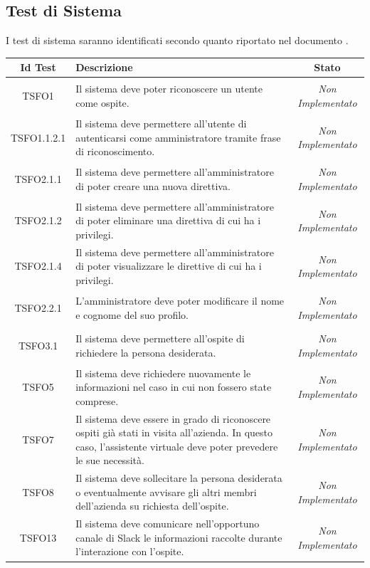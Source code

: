 \subsection{Test di Sistema}
I test di sistema saranno identificati secondo quanto riportato nel documento \NPdoc{}.
\normalsize
\begin{longtable}{|c|>{}m{8cm}|c|}
\hline
\textbf{Id Test} & \textbf{Descrizione} & \textbf{Stato}\\
\hline
\endhead
\hypertarget{TSFO1}{TSFO1} & Il sistema deve poter riconoscere un utente come ospite. & \textit{Non Implementato}\\ \hline
\hypertarget{TSFO1.1.2.1}{TSFO1.1.2.1} & Il sistema deve permettere all'utente di autenticarsi come amministratore tramite frase di riconoscimento. & \textit{Non Implementato}\\ \hline
\hypertarget{TSFO2.1.1}{TSFO2.1.1} & Il sistema deve permettere all'amministratore di poter creare una nuova direttiva. & \textit{Non Implementato}\\ \hline
\hypertarget{TSFO2.1.2}{TSFO2.1.2} & Il sistema deve permettere all'amministratore di poter eliminare una direttiva di cui ha i privilegi. & \textit{Non Implementato}\\ \hline
\hypertarget{TSFO2.1.4}{TSFO2.1.4} & Il sistema deve permettere all'amministratore di poter visualizzare le direttive di cui ha i privilegi. & \textit{Non Implementato}\\ \hline
\hypertarget{TSFO2.2.1}{TSFO2.2.1} & L'amministratore deve poter modificare il nome e cognome del suo profilo. & \textit{Non Implementato}\\ \hline
\hypertarget{TSFO3.1}{TSFO3.1} & Il sistema deve permettere all'ospite di richiedere la persona desiderata. & \textit{Non Implementato}\\ \hline
\hypertarget{TSFO5}{TSFO5} & Il sistema deve richiedere nuovamente le informazioni nel caso in cui non fossero state comprese. & \textit{Non Implementato}\\ \hline
\hypertarget{TSFO7}{TSFO7} & Il sistema deve essere in grado di riconoscere ospiti già stati in visita all'azienda. In questo caso, l'assistente virtuale deve poter prevedere le sue necessità. & \textit{Non Implementato}\\ \hline
\hypertarget{TSFO8}{TSFO8} & Il sistema deve sollecitare la persona desiderata o eventualmente avvisare gli altri membri dell'azienda su richiesta dell'ospite. & \textit{Non Implementato}\\ \hline
\hypertarget{TSFO13}{TSFO13} & Il sistema deve comunicare nell'opportuno canale di Slack le informazioni raccolte durante l'interazione con l'ospite. & \textit{Non Implementato}\\ \hline

\end{longtable}
